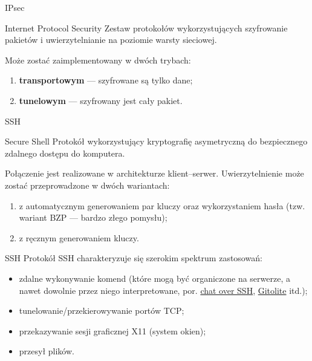 \begin{frame}{IPsec}
	\begin{alertblock}{Internet Protocol Security}
		Zestaw protokołów wykorzystujących szyfrowanie pakietów i uwierzytelnianie na poziomie warsty sieciowej. 
	\end{alertblock}
		\vspace{\fill}
		Może zostać zaimplementowany w dwóch trybach:
		
		\begin{enumerate}
			\item \textbf{transportowym} — szyfrowane są tylko dane;
			\item \textbf{tunelowym} — szyfrowany jest cały pakiet.
		\end{enumerate}
\end{frame}

\begin{frame}{SSH}
	\begin{alertblock}{Secure Shell}
		Protokół wykorzystujący kryptografię asymetryczną do bezpiecznego zdalnego dostępu do komputera. 
	\end{alertblock}
	
	Połączenie jest realizowane w architekturze klient--serwer. Uwierzytelnienie może zostać przeprowadzone w dwóch wariantach:
	\begin{enumerate}
		\item z automatycznym generowaniem par kluczy oraz wykorzystaniem hasła (tzw. wariant BZP --- bardzo złego pomysłu);
		\item z ręcznym generowaniem kluczy.
	\end{enumerate}
	
\end{frame}

\begin{frame}{SSH}
	Protokół SSH charakteryzuje się szerokim spektrum zastosowań:
	\begin{itemize}
		\item zdalne wykonywanie komend (które mogą być organiczone na serwerze, a nawet dowolnie przez niego interpretowane, por. \href{https://medium.com/@shazow/ssh-how-does-it-even-9e43586e4ffc}{chat over SSH}, \href{http://gitolite.com/}{Gitolite} itd.);
		\item tunelowanie/przekierowywanie portów TCP;
		\item przekazywanie sesji graficznej X11 (system okien);
		\item przesył plików.
	\end{itemize}
\end{frame}


